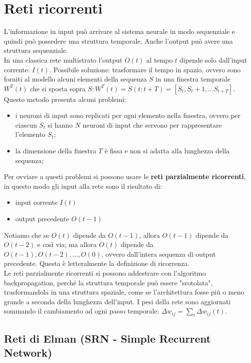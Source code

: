 \section{Reti ricorrenti}

L'informazione in input può arrivare al sistema neurale in modo sequenziale e
quindi può possedere una struttura temporale. Anche l'output può avere una
struttura sequenziale.\\
In una classica rete multistrato l'output $O(t)$ al tempo $t$ dipende solo
dall'input corrente: $I(t)$. Possibile soluzione: trasformare il tempo in
spazio, ovvero sono forniti al modello alcuni elementi della sequenza $S$ in
una finestra temporale $W^T(t)$ che si sposta sopra $S: W^T(t) = S(t:t+T) =
[S_t, S_t+1, \dots S_{t+T}]$.\\
Questo metodo presenta alcuni problemi:
\begin{itemize}
	\item i neuroni di input sono replicati per ogni elemento nella finestra,
		ovvero per ciascun $S_t$ si hanno $N$ neuroni di input che servono per
		rappresentare l'elemento $S_t$;

	\item la dimensione della finestra $T$ è fissa e non si adatta alla
		lunghezza della sequenza;
\end{itemize}

Per ovviare a questi problemi si possono usare le \textbf{reti parzialmente 
ricorrenti}, in questo modo gli input alla rete sono il risultato di:
\begin{itemize}
	\item input corrente $I(t)$
	\item output precedente $O(t-1)$
\end{itemize}

Notiamo che se $O(t)$ dipende da $O(t-1)$, allora $O(t-1)$ dipende da $O(t-2)$ e
così via; ma allora $O(t)$ dipende da $O(t-1), O(t-2), \dots, O(0)$, ovvero
dall'intera sequenza di output precedente. Questa è letteralmente la definizione
di ricorrenza.\\
Le reti parzialmente ricorrenti si possono addestrare con l'algoritmo
backpropagation, perché la struttura temporale può essere "srotolata",
trasformandola in una struttura spaziale, come se l'architettura fosse più o
meno grande a seconda della lunghezza dell'input. I pesi della rete sono
aggiornati sommando il cambiamento ad ogni passo temporale: $\Delta w_{ij} =
\sum_t \Delta w_{ij}(t)$.

\subsection{Reti di Elman (SRN - Simple Recurrent Network)}

